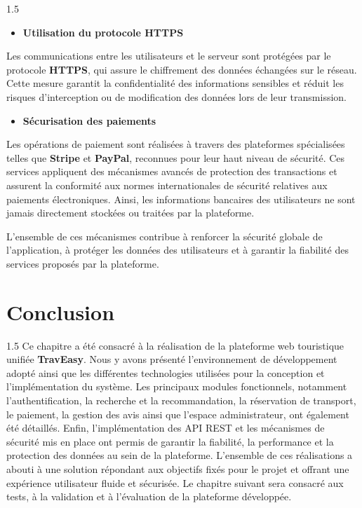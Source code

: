 \documentclass[a4paper,12pt]{report}
\begin{document}
\begin{spacing}{1.5}
\begin{itemize}
    \item \textbf{Utilisation du protocole HTTPS}
\end{itemize}
Les communications entre les utilisateurs et le serveur sont protégées par le protocole \textbf{HTTPS}, qui assure le chiffrement des données échangées sur le réseau. Cette mesure garantit la confidentialité des informations sensibles et réduit les risques d'interception ou de modification des données lors de leur transmission.
\begin{itemize}
    \item \textbf{Sécurisation des paiements}
\end{itemize}
Les opérations de paiement sont réalisées à travers des plateformes spécialisées telles que \textbf{Stripe} et \textbf{PayPal}, reconnues pour leur haut niveau de sécurité. Ces services appliquent des mécanismes avancés de protection des transactions et assurent la conformité aux normes internationales de sécurité relatives aux paiements électroniques. Ainsi, les informations bancaires des utilisateurs ne sont jamais directement stockées ou traitées par la plateforme.

L'ensemble de ces mécanismes contribue à renforcer la sécurité globale de l'application, à protéger les données des utilisateurs et à garantir la fiabilité des services proposés par la plateforme.


\end{spacing}
\section{Conclusion}
\vspace{0.5cm}
\begin{spacing}{1.5}
\justifying
Ce chapitre a été consacré à la réalisation de la plateforme web touristique unifiée \textbf{TravEasy}. Nous y avons présenté l'environnement de développement adopté ainsi que les différentes technologies utilisées pour la conception et l'implémentation du système. Les principaux modules fonctionnels, notamment l'authentification, la recherche et la recommandation, la réservation de transport, le paiement, la gestion des avis ainsi que l'espace administrateur, ont également été détaillés. Enfin, l'implémentation des API REST et les mécanismes de sécurité mis en place ont permis de garantir la fiabilité, la performance et la protection des données au sein de la plateforme. L'ensemble de ces réalisations a abouti à une solution répondant aux objectifs fixés pour le projet et offrant une expérience utilisateur fluide et sécurisée. Le chapitre suivant sera consacré aux tests, à la validation et à l'évaluation de la plateforme développée.

\end{spacing}
\newpage
\end{document}

